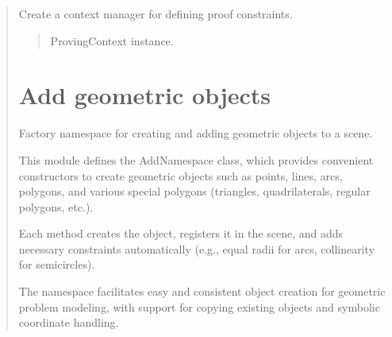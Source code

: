\documentclass[letterpaper,10pt,english]{sphinxmanual}
\begin{document}
\begin{quote}
\begin{fulllineitems}
\begin{fulllineitems}
\end{fulllineitems}


\begin{fulllineitems}
\label{\detokenize{pygeox:pygeox.geoscene.GeoScene.proving}}
\pysigstartsignatures
\pysiglinewithargsret
{}
{}
{}
\pysigstopsignatures
\sphinxAtStartPar
Create a context manager for defining proof constraints.
\begin{quote}\begin{description}
\sphinxAtStartPar
ProvingContext instance.

\end{description}\end{quote}

\end{fulllineitems}


\end{fulllineitems}



\chapter{Add geometric objects}
\label{\detokenize{pygeox:module-pygeox.add_objects}}\label{\detokenize{pygeox:add-geometric-objects}}
\sphinxAtStartPar
Factory namespace for creating and adding geometric objects to a scene.

\sphinxAtStartPar
This module defines the AddNamespace class, which provides convenient constructors
to create geometric objects such as points, lines, arcs, polygons, and various
special polygons (triangles, quadrilaterals, regular polygons, etc.).

\sphinxAtStartPar
Each method creates the object, registers it in the scene, and adds necessary
constraints automatically (e.g., equal radii for arcs, collinearity for semicircles).

\sphinxAtStartPar
The namespace facilitates easy and consistent object creation for geometric problem
modeling, with support for copying existing objects and symbolic coordinate handling.


\end{quote}
\end{document}
